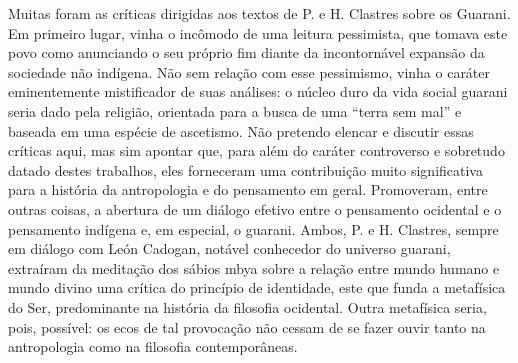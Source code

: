 \documentclass{article}
\begin{document}
Muitas foram as cr\'iticas dirigidas aos textos de P. e H. Clastres
sobre os Guarani. Em primeiro lugar, vinha o inc\^omodo de uma leitura
pessimista, que tomava este povo como anunciando o seu pr\'oprio fim
diante da incontorn\'avel expans\~ao da sociedade n\~ao ind\'igena.
N\~ao sem rela\c{c}\~ao com esse pessimismo, vinha o car\'ater
eminentemente mistificador de suas an\'alises: o n\'ucleo duro da vida
social guarani seria dado pela religi\~ao, orientada para a busca de
uma {\textquotedblleft}terra sem mal{\textquotedblright} e baseada em
uma esp\'ecie de ascetismo. N\~ao pretendo elencar e discutir essas
cr\'iticas aqui, mas sim apontar que, para al\'em do car\'ater
controverso e sobretudo datado destes trabalhos, eles forneceram uma
contribui\c{c}\~ao muito significativa para a hist\'oria da
antropologia e do pensamento em geral. Promoveram, entre outras coisas,
a abertura de um di\'alogo efetivo entre o pensamento ocidental e o
pensamento ind\'igena e, em especial, o guarani. Ambos, P. e H.
Clastres, sempre em di\'alogo com Le\'on Cadogan, not\'avel conhecedor
do universo guarani, extra\'iram da medita\c{c}\~ao dos s\'abios mbya
sobre a rela\c{c}\~ao entre mundo humano e mundo divino uma cr\'itica
do princ\'ipio de identidade, este que funda a metaf\'isica do Ser,
predominante na hist\'oria da filosofia ocidental. Outra metaf\'isica
seria, pois, poss\'ivel: os ecos de tal provoca\c{c}\~ao n\~ao cessam
de se fazer ouvir tanto na antropologia como na filosofia
contempor\^aneas.
\end{document}
